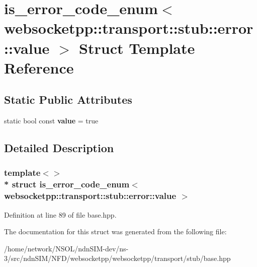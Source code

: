 \hypertarget{structis__error__code__enum_3_01websocketpp_1_1transport_1_1stub_1_1error_1_1value_01_4}{}\section{is\+\_\+error\+\_\+code\+\_\+enum$<$ websocketpp\+:\+:transport\+:\+:stub\+:\+:error\+:\+:value $>$ Struct Template Reference}
\label{structis__error__code__enum_3_01websocketpp_1_1transport_1_1stub_1_1error_1_1value_01_4}
\subsection*{Static Public Attributes}
\begin{DoxyCompactItemize}
\item 
static bool const {\bfseries value} = true\hypertarget{structis__error__code__enum_3_01websocketpp_1_1transport_1_1stub_1_1error_1_1value_01_4_a48ac59af9c03585ba1f1f7b8e83a45ee}{}\label{structis__error__code__enum_3_01websocketpp_1_1transport_1_1stub_1_1error_1_1value_01_4_a48ac59af9c03585ba1f1f7b8e83a45ee}

\end{DoxyCompactItemize}


\subsection{Detailed Description}
\subsubsection*{template$<$$>$\\*
struct is\+\_\+error\+\_\+code\+\_\+enum$<$ websocketpp\+::transport\+::stub\+::error\+::value $>$}



Definition at line 89 of file base.\+hpp.



The documentation for this struct was generated from the following file\+:\begin{DoxyCompactItemize}
\item 
/home/network/\+N\+S\+O\+L/ndn\+S\+I\+M-\/dev/ns-\/3/src/ndn\+S\+I\+M/\+N\+F\+D/websocketpp/websocketpp/transport/stub/base.\+hpp\end{DoxyCompactItemize}
